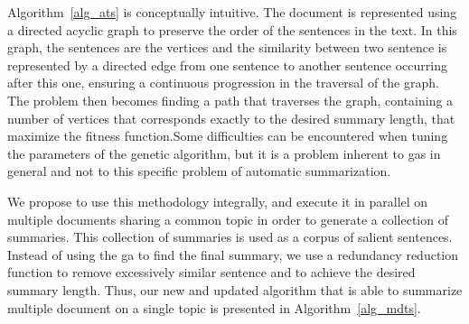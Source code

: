 \documentclass[12pt, titlepage]{uo_temp}
\makeatletter
\def\BState{\State\hskip-\ALG@thistlm}
\makeatother
\begin{document}
     Algorithm~\ref{alg_ats} is conceptually intuitive. The document is represented using
     a directed acyclic graph to preserve the order of the sentences in the text. In this
     graph, the sentences are the vertices and the similarity between two sentence is
     represented by a directed edge from one sentence to another sentence occurring after
     this one, ensuring a continuous progression in the traversal of the graph. The
     problem then becomes finding a path that traverses the graph, containing a number of
     vertices that corresponds exactly to the desired summary length, that maximize the
     fitness function.Some difficulties can be encountered when tuning the parameters of
     the genetic algorithm, but it is a problem inherent to \gls{ga}s in general and not
     to this specific problem of automatic summarization.

     We propose to use this methodology integrally, and execute it in parallel on multiple
     documents sharing a common topic in order to generate a collection of summaries. This
     collection of summaries is used as a corpus of salient sentences.  Instead of using
     the \gls{ga} to find the final summary, we use a redundancy reduction function to
     remove excessively similar sentence and to achieve the desired summary length. Thus,
     our new and updated algorithm that is able to summarize multiple document on a single
     topic is presented in Algorithm~\ref{alg_mdts}.
     
     \begin{algorithm}
     \end{algorithm}
     
\end{document}
